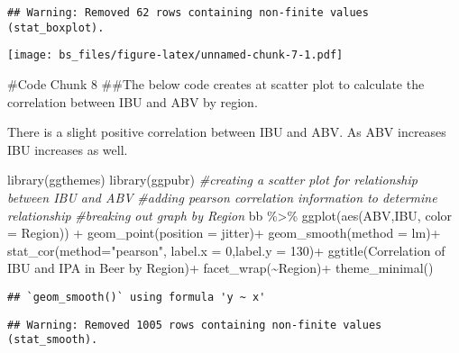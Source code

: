 \documentclass[
]{article}
\newenvironment{Shaded}{\begin{snugshade}}{\end{snugshade}}
\newcommand{\AttributeTok}[1]{\textcolor[rgb]{0.77,0.63,0.00}{#1}}
\newcommand{\CommentTok}[1]{\textcolor[rgb]{0.56,0.35,0.01}{\textit{#1}}}
\newcommand{\DecValTok}[1]{\textcolor[rgb]{0.00,0.00,0.81}{#1}}
\newcommand{\FunctionTok}[1]{\textcolor[rgb]{0.00,0.00,0.00}{#1}}
\newcommand{\NormalTok}[1]{#1}
\newcommand{\SpecialCharTok}[1]{\textcolor[rgb]{0.00,0.00,0.00}{#1}}
\newcommand{\StringTok}[1]{\textcolor[rgb]{0.31,0.60,0.02}{#1}}
\begin{document}
\begin{verbatim}
## Warning: Removed 62 rows containing non-finite values (stat_boxplot).
\end{verbatim}

\texttt{[image: bs\_files/figure-latex/unnamed-chunk-7-1.pdf]}

\#Code Chunk 8 \#\#The below code creates at scatter plot to calculate
the correlation between IBU and ABV by region.

There is a slight positive correlation between IBU and ABV. As ABV
increases IBU increases as well.

\begin{Shaded}
\begin{Highlighting}[]
\FunctionTok{library}\NormalTok{(ggthemes)}
\FunctionTok{library}\NormalTok{(ggpubr)}
\CommentTok{\#creating a scatter plot for relationship between IBU and ABV}
\CommentTok{\#adding pearson correlation information to determine relationship}
\CommentTok{\#breaking out graph by Region}
\NormalTok{bb }\SpecialCharTok{\%\textgreater{}\%}
   \FunctionTok{ggplot}\NormalTok{(}\FunctionTok{aes}\NormalTok{(ABV,IBU, }\AttributeTok{color =}\NormalTok{ Region)) }\SpecialCharTok{+}
   \FunctionTok{geom\_point}\NormalTok{(}\AttributeTok{position =} \StringTok{\textquotesingle{}jitter\textquotesingle{}}\NormalTok{)}\SpecialCharTok{+}
   \FunctionTok{geom\_smooth}\NormalTok{(}\AttributeTok{method =} \StringTok{\textquotesingle{}lm\textquotesingle{}}\NormalTok{)}\SpecialCharTok{+}
   \FunctionTok{stat\_cor}\NormalTok{(}\AttributeTok{method=}\StringTok{"pearson"}\NormalTok{, }\AttributeTok{label.x =} \DecValTok{0}\NormalTok{,}\AttributeTok{label.y =} \DecValTok{130}\NormalTok{)}\SpecialCharTok{+}
   \FunctionTok{ggtitle}\NormalTok{(}\StringTok{\textquotesingle{}Correlation of IBU and IPA in Beer by Region\textquotesingle{}}\NormalTok{)}\SpecialCharTok{+}
   \FunctionTok{facet\_wrap}\NormalTok{(}\SpecialCharTok{\textasciitilde{}}\NormalTok{Region)}\SpecialCharTok{+}
   \FunctionTok{theme\_minimal}\NormalTok{()}
\end{Highlighting}
\end{Shaded}

\begin{verbatim}
## `geom_smooth()` using formula 'y ~ x'
\end{verbatim}

\begin{verbatim}
## Warning: Removed 1005 rows containing non-finite values (stat_smooth).
\end{verbatim}
\end{document}
